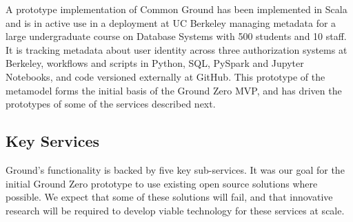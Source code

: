 A prototype implementation of Common Ground has been implemented in Scala and is in active use in a deployment at UC Berkeley managing metadata for a large undergraduate course on Database Systems with 500 students and 10 staff. It is tracking metadata about user identity across three authorization systems at Berkeley, workflows and scripts in Python, SQL, PySpark and Jupyter Notebooks, and code versioned externally at GitHub.  This prototype of the metamodel forms the initial basis of the Ground Zero MVP, and has driven the prototypes of some of the services described next.

\subsection{Key Services}
Ground's functionality is backed by five key sub-services.  It was our goal for the initial Ground Zero prototype to use existing open source solutions where possible.  We expect that some of these solutions will fail, and that innovative research will be required to develop viable technology for these services at scale.

